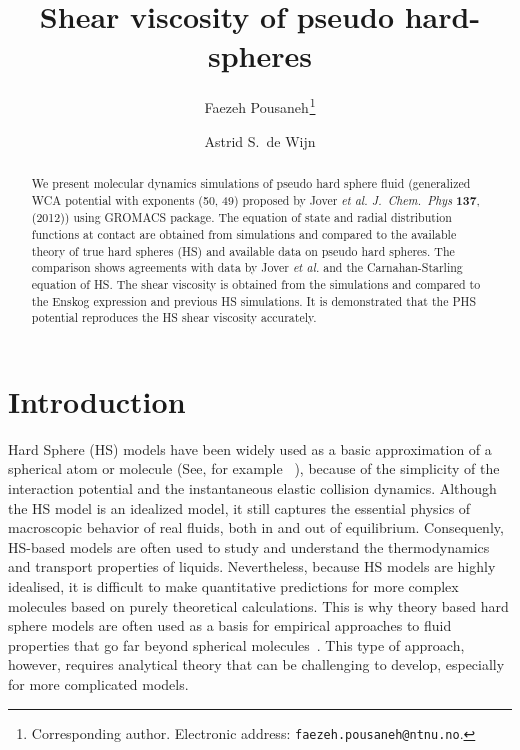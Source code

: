 \documentclass[preprint,pre,aps,superscriptaddress,a4paper]{revtex4}
\begin{document}
\title{
Shear viscosity of pseudo hard-spheres%
}

\author{Faezeh Pousaneh$^{\scriptscriptstyle{}}$\footnote{Corresponding
    author. Electronic address: \texttt{faezeh.pousaneh@ntnu.no}.}}  
%
%
\author{Astrid S.\ de Wijn  }




\begin{abstract}
We present molecular dynamics simulations of pseudo hard sphere fluid (generalized WCA  potential with exponents (50, 49) proposed by Jover {\it {et al.}} {\it J.~Chem.~Phys} {\bf 137}, (2012))  using GROMACS package.  The equation of state and radial distribution functions at contact are obtained from simulations and compared to the available theory of true hard spheres (HS) and available data on pseudo hard spheres.  The comparison shows agreements with  data by  Jover {\it {et al.}} and the  Carnahan-Starling equation of HS. The shear viscosity is obtained from the simulations and  compared to the Enskog expression and previous HS simulations. It is demonstrated that the PHS potential  reproduces the HS shear viscosity accurately. 

\end{abstract}
\maketitle

\section{Introduction}
Hard Sphere (HS) models have been widely used as a basic approximation of a spherical atom or molecule (See, for example ~\cite{pippo}), because of the simplicity of the interaction potential and the instantaneous elastic collision dynamics.
Although the HS model is an idealized model, it still captures the essential physics of macroscopic behavior of real fluids, both in and out of equilibrium.
Consequenly, HS-based models are often used to study and understand the thermodynamics and transport properties of liquids.
Nevertheless, because HS models are highly idealised, it is difficult to make quantitative predictions for more complex molecules based on purely theoretical calculations.
This is why theory based hard sphere models are often used as a basis for empirical approaches to fluid properties that go far beyond spherical molecules~\cite{VW,viscvogelmethane}.
This type of approach, however, requires analytical theory that can be challenging to develop, especially for more complicated models.
\end{document}
